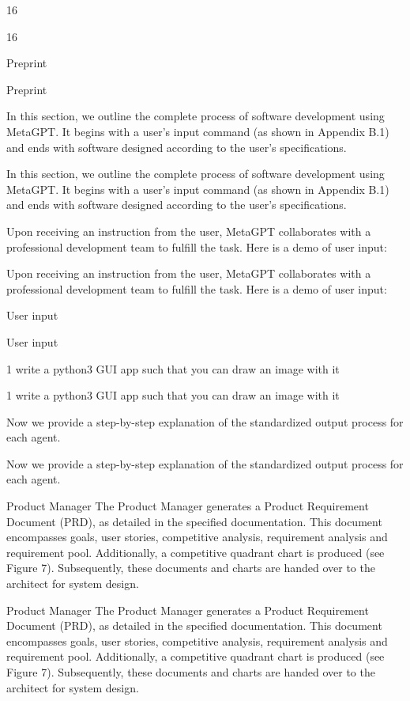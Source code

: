 \documentclass[12pt]{article}
\begin{document}
16


16


Preprint


Preprint


In this section, we outline the complete process of software development using MetaGPT. It begins
with a user’s input command (as shown in Appendix B.1) and ends with software designed according
to the user’s specifications.


In this section, we outline the complete process of software development using MetaGPT. It begins
with a user’s input command (as shown in Appendix B.1) and ends with software designed according
to the user’s specifications.


Upon receiving an instruction from the user, MetaGPT collaborates with a professional development
team to fulfill the task. Here is a demo of user input:


Upon receiving an instruction from the user, MetaGPT collaborates with a professional development
team to fulfill the task. Here is a demo of user input:


User input


User input


1 write a python3 GUI app such that you can draw an image with it


1 write a python3 GUI app such that you can draw an image with it


Now we provide a step-by-step explanation of the standardized output process for each agent.


Now we provide a step-by-step explanation of the standardized output process for each agent.


Product Manager The Product Manager generates a Product Requirement Document (PRD), as
detailed in the specified documentation. This document encompasses goals, user stories, competitive
analysis, requirement analysis and requirement pool. Additionally, a competitive quadrant chart is
produced (see Figure 7). Subsequently, these documents and charts are handed over to the architect
for system design.


Product Manager The Product Manager generates a Product Requirement Document (PRD), as
detailed in the specified documentation. This document encompasses goals, user stories, competitive
analysis, requirement analysis and requirement pool. Additionally, a competitive quadrant chart is
produced (see Figure 7). Subsequently, these documents and charts are handed over to the architect
for system design.
\end{document}
